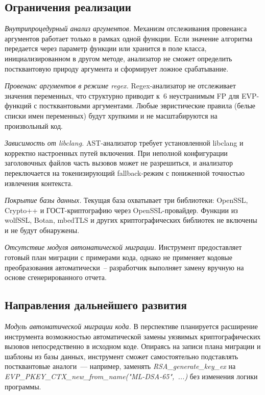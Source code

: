 \documentclass{itmo-vkr}
\newcommand{\code}[1]{\textit{#1}}
\begin{document}
\subsection{Ограничения реализации}

\noindent\textit{Внутрипроцедурный анализ аргументов.}\quad
Механизм отслеживания провенанса аргументов работает только
в рамках одной функции.
Если значение алгоритма передается через параметр функции или
хранится в поле класса, инициализированном в другом методе,
анализатор не сможет определить постквантовую природу аргумента
и сформирует ложное срабатывание.

\noindent\textit{Провенанс аргументов в режиме regex.}\quad
Regex-анализатор не отслеживает значения переменных, что
структурно приводит к~6 неустранимым FP для EVP-функций
с постквантовыми аргументами.
Любые эвристические правила (белые списки имен переменных)
будут хрупкими и не масштабируются на произвольный код.

\noindent\textit{Зависимость от libclang.}\quad
AST-анализатор требует установленной libclang и корректно
настроенных путей включения.
При неполной конфигурации заголовочных файлов часть вызовов
может не разрешиться, и анализатор переключается на
токенизирующий fallback-режим с пониженной точностью
извлечения контекста.

\noindent\textit{Покрытие базы данных.}\quad
Текущая база охватывает три библиотеки: OpenSSL, Crypto++
и ГОСТ-криптографию через OpenSSL-провайдер.
Функции из wolfSSL, Botan, mbedTLS и других криптографических
библиотек не включены и не будут обнаружены.

\noindent\textit{Отсутствие модуля автоматической миграции.}\quad
Инструмент предоставляет готовый план миграции с примерами кода,
однако не применяет кодовые преобразования автоматически~--
разработчик выполняет замену вручную на основе сгенерированного
отчета.

\subsection{Направления дальнейшего развития}

\noindent\textit{Модуль автоматической миграции кода.}\quad
В перспективе планируется расширение инструмента
возможностью автоматической замены уязвимых криптографических
вызовов непосредственно в исходном коде. Опираясь на записи
плана миграции и шаблоны из базы данных, инструмент сможет
самостоятельно подставлять постквантовые аналоги~--- например,
заменять \code{RSA\_generate\_key\_ex} на
\code{EVP\_PKEY\_CTX\_new\_from\_name("ML-DSA-65",~...)}
без изменения логики программы.
\end{document}
